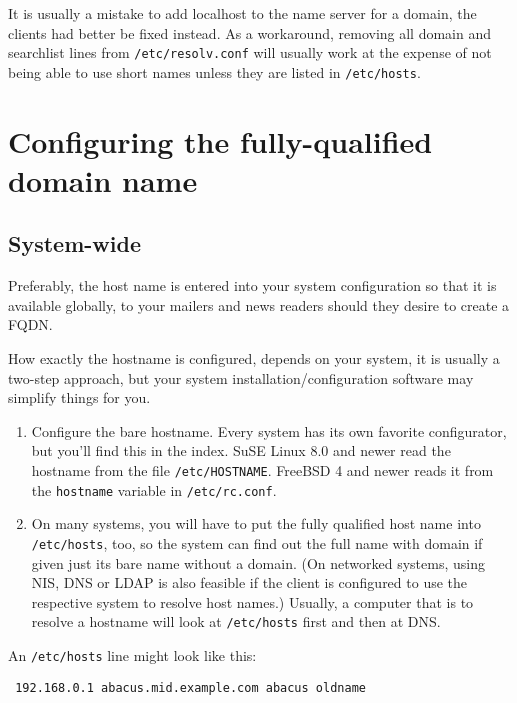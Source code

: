 \documentclass[10pt,english,a5paper]{article}
\begin{document}
{\small
It is usually a mistake to add localhost to the name server for a
domain, the clients had better be fixed instead. As a workaround,
removing all domain and searchlist lines from \texttt{/etc/resolv.conf} will
usually work at the expense of not being able to use short names unless
they are listed in \texttt{/etc/hosts}.}

\section{Configuring the fully-qualified domain name\label{configure}}
\subsection{System-wide}

Preferably, the host name is entered into your system configuration so
that it is available globally, to your mailers and news readers should
they desire to create a FQDN\@.

How exactly the hostname is configured, depends on your system, it is
usually a two-step approach, but your system installation/configuration
software may simplify things for you.

\begin{enumerate}
    \item Configure the bare hostname. Every system has its own favorite
	configurator, but you'll find this in the index. SuSE Linux 8.0
	and newer read the hostname from the file
	\texttt{/etc/HOSTNAME}. FreeBSD 4 and newer reads it from the
	\texttt{hostname} variable in \texttt{/etc/rc.conf}.

    \item On many systems, you will have to put the fully qualified host
	name into \texttt{/etc/hosts}, too, so the system can find out
	the full name with domain if given just its bare name without a
	domain. (On networked systems, using NIS, DNS or LDAP is also
	feasible if the client is configured to use the respective
	system to resolve host names.) Usually, a computer that is to
	resolve a hostname will look at \texttt{/etc/hosts} first and
	then at DNS\@.
\end{enumerate}

An \texttt{/etc/hosts} line might look like this:

\begin{verbatim}
 192.168.0.1 abacus.mid.example.com abacus oldname
\end{verbatim}
\end{document}
